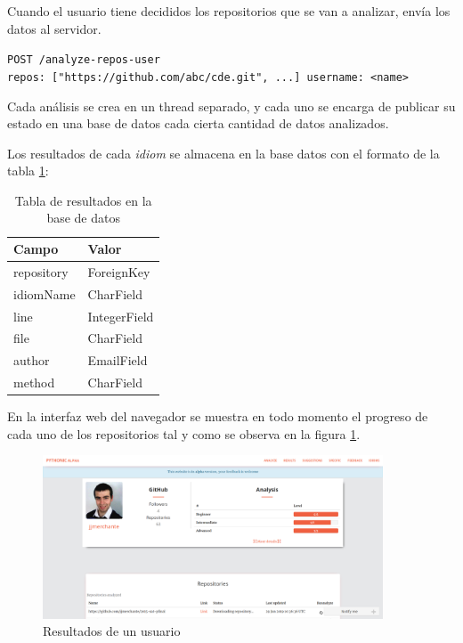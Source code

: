 \documentclass[a4paper, 12pt]{book}
\begin{document}
Cuando el usuario tiene decididos los repositorios que se van a analizar, envía los datos al servidor. 

\texttt{POST /analyze-repos-user}\\
\texttt{repos: ["https://github.com/abc/cde.git", ...] username: <name>}

Cada análisis se crea en un thread separado, y cada uno se encarga de publicar su estado en una base de datos cada cierta cantidad de datos analizados.

Los resultados de cada \textit{idiom} se almacena en la base datos con el formato de la tabla \ref{table:result}:


\begin{table}[H]
\begin{center}
\begin{tabular} { | l | l | }
\hline
\textbf{Campo} & \textbf{Valor} \\
\hline
repository &  ForeignKey \\ 
idiomName &  CharField \\ 
line &  IntegerField \\ 
file &  CharField \\ 
author & EmailField \\ 
method &  CharField \\ 

\hline
\end{tabular}
\end{center}
\caption{Tabla de resultados en la base de datos}
\label{table:result}
\end{table}


En la interfaz web del navegador se muestra en todo momento el progreso de cada uno de los repositorios tal y como se observa en la figura \ref{fig:usuario}. 

\begin{figure}[H]
    \centering
    \includegraphics[width=0.9\textwidth]{img/1usuario.png}
    \caption{Resultados de un usuario}
    \label{fig:usuario}
\end{figure}
\end{document}
